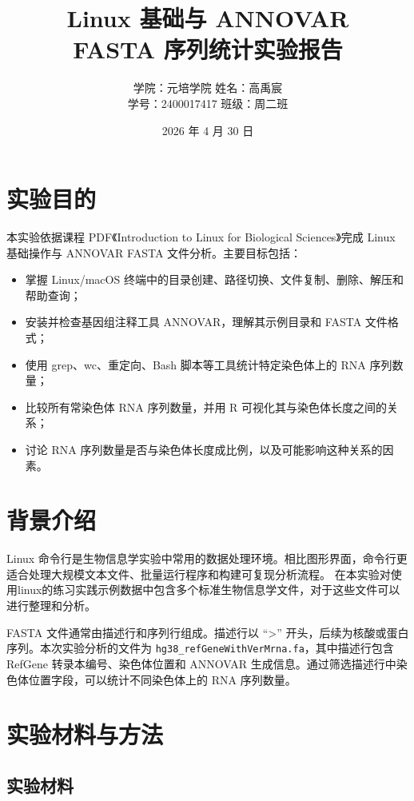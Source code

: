 \documentclass[12pt,a4paper,fontset=fandol]{ctexart}
\title{\heiti Linux 基础与 ANNOVAR\\FASTA 序列统计实验报告}
\author{
学院：元培学院 \qquad 姓名：高禹宸\\
学号：2400017417 \qquad 班级：周二班
}
\date{2026 年 4 月 30 日}
\begin{document}
\maketitle
\thispagestyle{empty}

\section{实验目的}

本实验依据课程 PDF《Introduction to Linux for Biological Sciences》完成 Linux 基础操作与 ANNOVAR FASTA 文件分析。主要目标包括：

\begin{itemize}
  \item 掌握 Linux/macOS 终端中的目录创建、路径切换、文件复制、删除、解压和帮助查询；
  \item 安装并检查基因组注释工具 ANNOVAR，理解其示例目录和 FASTA 文件格式；
  \item 使用 grep、wc、重定向、Bash 脚本等工具统计特定染色体上的 RNA 序列数量；
  \item 比较所有常染色体 RNA 序列数量，并用 R 可视化其与染色体长度之间的关系；
  \item 讨论 RNA 序列数量是否与染色体长度成比例，以及可能影响这种关系的因素。
\end{itemize}

\section{背景介绍}

Linux 命令行是生物信息学实验中常用的数据处理环境。相比图形界面，命令行更适合处理大规模文本文件、批量运行程序和构建可复现分析流程。
在本实验对使用linux的练习实践示例数据中包含多个标准生物信息学文件，对于这些文件可以进行整理和分析。

FASTA 文件通常由描述行和序列行组成。描述行以 ``>'' 开头，后续为核酸或蛋白序列。本次实验分析的文件为 \texttt{hg38\_refGeneWithVerMrna.fa}，其中描述行包含 RefGene 转录本编号、染色体位置和 ANNOVAR 生成信息。通过筛选描述行中染色体位置字段，可以统计不同染色体上的 RNA 序列数量。

\section{实验材料与方法}

\subsection{实验材料}
\end{document}
